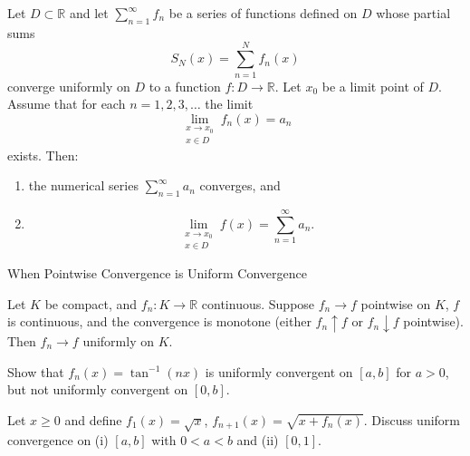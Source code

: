 \documentclass[12pt, a4paper]{article}
\begin{document}
\begin{theorem}
Let $D\subset\mathbb{R}$ and let $\sum_{n=1}^{\infty} f_n$ be a series of functions
defined on $D$ whose partial sums
\[
S_N(x)=\sum_{n=1}^{N} f_n(x)
\]
converge uniformly on $D$ to a function $f:D\to\mathbb{R}$.
Let $x_0$ be a limit point of $D$.
Assume that for each $n=1,2,3,\dots$ the limit
\[
\lim_{\substack{x\to x_0\\ x\in D}} f_n(x)=a_n
\]
exists. Then:
\begin{enumerate}
\item the numerical series $\displaystyle \sum_{n=1}^{\infty} a_n$ converges, and
\item
\[
\lim_{\substack{x\to x_0\\ x\in D}} f(x)=\sum_{n=1}^{\infty} a_n.
\]
\end{enumerate}
\end{theorem}



\clearpage

\begin{heading}
    When Pointwise Convergence is Uniform Convergence
\end{heading}

\vspace{10pt}

\begin{theorem}
Let $K$ be compact, and $f_n:K\to\mathbb{R}$ continuous. Suppose $f_n\to f$ pointwise on $K$,
$f$ is continuous, and the convergence is monotone (either $f_n\uparrow f$ or $f_n\downarrow f$ pointwise).
Then $f_n\to f$ uniformly on $K$.
\end{theorem}

\clearpage

\begin{problem}
    Show that $f_n(x)=\tan^{-1}(nx)$ is uniformly convergent on $[a,b]$ for $a>0$,
but not uniformly convergent on $[0,b]$.    
\end{problem}

\clearpage

\begin{problem}
    Let $x\ge 0$ and define $f_1(x)=\sqrt{x}$, $f_{n+1}(x)=\sqrt{x+f_n(x)}$.
Discuss uniform convergence on (i) $[a,b]$ with $0<a<b$ and (ii) $[0,1]$.
\end{problem}


\EndPage
\end{document}
